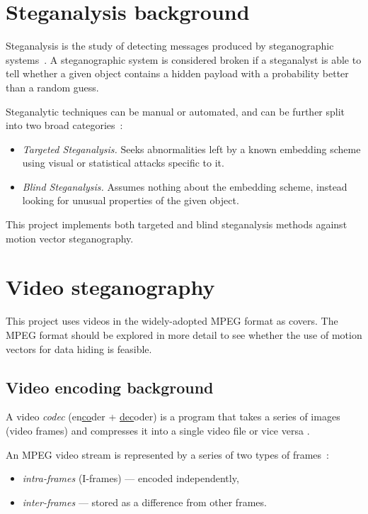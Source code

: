 \documentclass[12pt,british,twoside,notitlepage,usenames,dvipsnames,hypens,final]{report}
\numberwithin{equation}{section}
\numberwithin{figure}{section}
\begin{document}
\section{Steganalysis background}

Steganalysis is the study of detecting messages produced by steganographic systems~\cite[p.~10]{fridrich}. A steganographic system is considered broken if a steganalyst is able to tell whether a given object contains a hidden payload with a probability better than a random guess.

Steganalytic techniques can be manual or automated, and can be further split into two broad categories~\cite{bateman}:
\begin{itemize}
\item \emph{Targeted Steganalysis.} Seeks abnormalities left by a known embedding scheme using visual or statistical attacks specific to it.
\item \emph{Blind Steganalysis.} Assumes nothing about the embedding scheme, instead looking for unusual properties of the given object. 
\end{itemize} 

This project implements both targeted and blind steganalysis methods against motion vector steganography.

\section{Video steganography}

This project uses videos in the widely-adopted MPEG format as covers. The MPEG format should be explored in more detail to see whether the use of motion vectors for data hiding is feasible.

\subsection{Video encoding background}

A video \emph{codec} (en\underline{co}der + \underline{dec}oder) is a program that takes a series of images (video frames) and compresses it into a single video file or vice versa \cite[sec.~3.1]{richardson2004h}.

An MPEG video stream is represented by a series of two types of frames~\cite{h264-std}:
\begin{itemize}
\item \emph{intra-frames} (I-frames) --- encoded independently,
\item \emph{inter-frames} --- stored as a difference from other frames.
\end{itemize}
\end{document}
